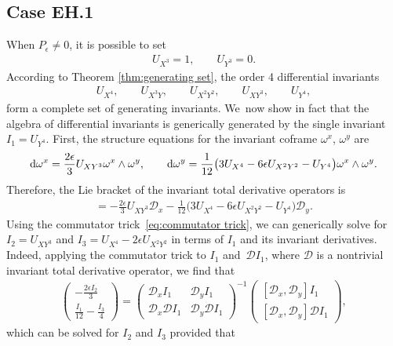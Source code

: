 \documentclass[pdftex]{sigma}%
\numberwithin{equation}{section}
\newcommand{\D}{\mathcal{D}}
\begin{document}
\subsection{Case EH.1}

When $P_\epsilon \neq 0$, it is possible to set
\begin{gather*}
U_{X^3} =1,\qquad U_{Y^3}=0.
\end{gather*}
According to Theorem \ref{thm:generating set}, the order 4 differential invariants
\begin{gather*}
U_{X^4}, \qquad U_{X^3Y}, \qquad U_{X^2Y^2}, \qquad U_{XY^3}, \qquad U_{Y^4},
\end{gather*}
form a complete set of generating invariants. We~now show in fact that the algebra of differential invariants is generically generated by the single invariant $I_1= U_{Y^4}$. First, the structure equations for the invariant coframe $\omega^x$, $\omega^y$ are
\begin{gather*}
{\rm d}\omega^x = \frac{2\epsilon}{3} U_{XY^3} \omega^x\wedge\omega^y,\qquad
{\rm d}\omega^y = \frac{1}{12}\big(3U_{X^4}-6\epsilon U_{X^2Y^2} - U_{Y^4}\big) \omega^x\wedge\omega^y.
\end{gather*}
Therefore, the Lie bracket of the invariant total derivative operators is
\begin{gather*}
[\D_x,\D_y] = -\frac{2\epsilon}{3} U_{XY^3} \D_x - \frac{1}{12}\big(3U_{X^4}-6\epsilon U_{X^2Y^2} - U_{Y^4}\big) \D_y.
\end{gather*}
Using the commutator trick~\eqref{eq:commutator trick}, we can generically solve for $I_2=U_{XY^3}$ and $I_3=U_{X^4}-2\epsilon U_{X^2Y^2}$ in terms of $I_1$ and its invariant derivatives. Indeed, applying the commutator trick to $I_1$ and~$\D I_1$, where $\D$ is a nontrivial invariant total derivative operator, we find that
%
\begin{gather*}
\begin{pmatrix}
-\frac{2\epsilon I_2}{3} \\[.5ex]
\frac{I_1}{12}-\frac{I_3}{4}
\end{pmatrix}
=
\begin{pmatrix}
\D_x I_1 & \D_y I_1 \\[.5ex]
\D_x\D I_1 & \D_y\D I_1
\end{pmatrix}^{-1}
\begin{pmatrix}
[\D_x,\D_y]I_1 \\[.5ex]
[\D_x,\D_y]\D I_1
\end{pmatrix},
\end{gather*}
which can be solved for $I_2$ and $I_3$ provided that
\end{document}
